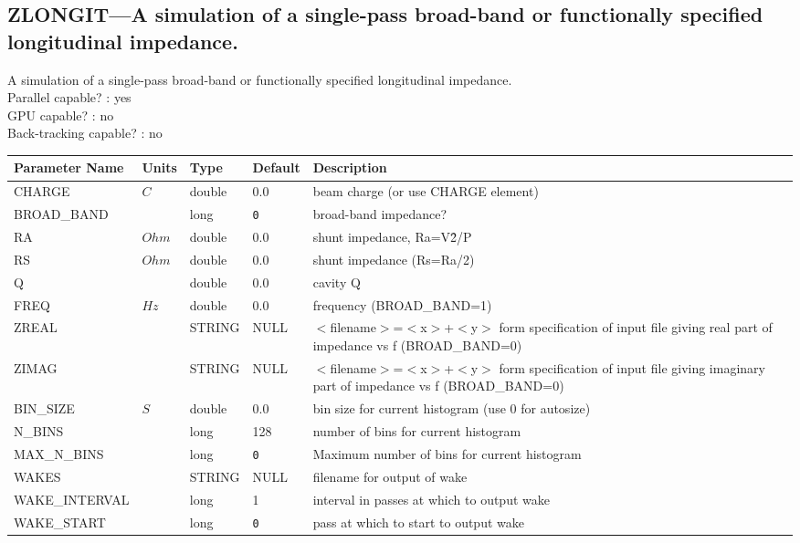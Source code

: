 \subsection{ZLONGIT---A simulation of a single-pass broad-band or functionally specified longitudinal impedance.}
A simulation of a single-pass broad-band or functionally specified longitudinal impedance.
\\
Parallel capable? : yes\\
GPU capable? : no\\
Back-tracking capable? : no\\
\begin{tabular}{|l|l|l|l|p{\descwidth}|} \hline
Parameter Name & Units & Type & Default & Description \\ \hline 
CHARGE & $C$ & double &  0.0 & beam charge (or use CHARGE element)  \\ \hline 
BROAD\_BAND &  & long &  \verb|0| & broad-band impedance?  \\ \hline 
RA & $Ohm$ & double &  0.0 & shunt impedance, Ra=V\^2/P  \\ \hline 
RS & $Ohm$ & double &  0.0 & shunt impedance (Rs=Ra/2)  \\ \hline 
Q &  & double &  0.0 & cavity Q  \\ \hline 
FREQ & $Hz$ & double &  0.0 & frequency (BROAD\_BAND=1)  \\ \hline 
ZREAL &  & STRING &   NULL            & $<$filename$>$=$<$x$>$+$<$y$>$ form specification of input file giving real part of impedance vs f (BROAD\_BAND=0)  \\ \hline 
ZIMAG &  & STRING &   NULL            & $<$filename$>$=$<$x$>$+$<$y$>$ form specification of input file giving imaginary part of impedance vs f (BROAD\_BAND=0)  \\ \hline 
BIN\_SIZE & $S$ & double &  0.0 & bin size for current histogram (use 0 for autosize)  \\ \hline 
N\_BINS &  & long &   128             & number of bins for current histogram  \\ \hline 
MAX\_N\_BINS &  & long &  \verb|0| & Maximum number of bins for current histogram  \\ \hline 
WAKES &  & STRING &   NULL            & filename for output of wake  \\ \hline 
WAKE\_INTERVAL &  & long &   1               & interval in passes at which to output wake  \\ \hline 
WAKE\_START &  & long &  \verb|0| & pass at which to start to output wake  \\ \hline 

\end{tabular}

